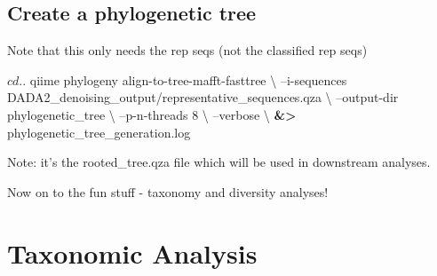 \documentclass[
]{book}
\newenvironment{Shaded}{\begin{snugshade}}{\end{snugshade}}
\newcommand{\BuiltInTok}[1]{#1}
\newcommand{\CommentTok}[1]{\textcolor[rgb]{0.56,0.35,0.01}{\textit{#1}}}
\newcommand{\ExtensionTok}[1]{#1}
\newcommand{\FunctionTok}[1]{\textcolor[rgb]{0.00,0.00,0.00}{#1}}
\newcommand{\NormalTok}[1]{#1}
\newcommand{\OperatorTok}[1]{\textcolor[rgb]{0.81,0.36,0.00}{\textbf{#1}}}
\begin{document}
\begin{Shaded}
\end{Shaded}

\hypertarget{create-a-phylogenetic-tree}{%
\section{Create a phylogenetic tree}\label{create-a-phylogenetic-tree}}

Note that this only needs the rep seqs (not the classified rep seqs)

\begin{Shaded}
\begin{Highlighting}[]
\NormalTok{$ }\BuiltInTok{cd}\NormalTok{ ..}

\NormalTok{$ }\ExtensionTok{qiime}\NormalTok{ phylogeny align-to-tree-mafft-fasttree \textbackslash{}}
\NormalTok{--i-sequences DADA2_denoising_output/representative_sequences.qza \textbackslash{}}
\NormalTok{--output-dir phylogenetic_tree \textbackslash{}}
\NormalTok{--p-n-threads 8 \textbackslash{}}
\NormalTok{--verbose \textbackslash{}}
\OperatorTok{&>}\NormalTok{ phylogenetic_tree_generation.log}
\end{Highlighting}
\end{Shaded}

Note: it's the rooted\_tree.qza file which will be used in downstream analyses.

Now on to the fun stuff - taxonomy and diversity analyses!

\hypertarget{taxonomic-analysis}{%
\chapter{Taxonomic Analysis}\label{taxonomic-analysis}}
\end{document}
